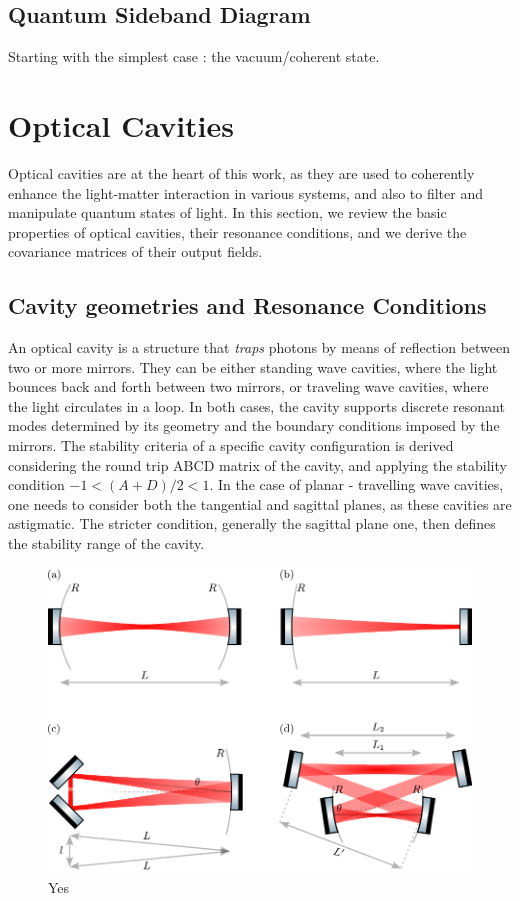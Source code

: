 \subsection{Quantum Sideband Diagram }

Starting with the simplest case : the vacuum/coherent state. 
\section{Optical Cavities}
Optical cavities are at the heart of this work, as they are used to coherently enhance the light-matter interaction in various systems, and also to filter and manipulate quantum states of light. In this section, we review the basic properties of optical cavities, their resonance conditions, and we derive the covariance matrices of their output fields. 

\subsection{Cavity geometries and Resonance Conditions}
An optical cavity is a structure that \textit{traps} photons by means of reflection between two or more mirrors. They can be either standing wave cavities, where the light bounces back and forth between two mirrors, or traveling wave cavities, where the light circulates in a loop. In both cases, the cavity supports discrete resonant modes determined by its geometry and the boundary conditions imposed by the mirrors. The stability criteria of a specific cavity configuration is derived considering the round trip ABCD matrix of the cavity, and applying the stability condition $-1 < (A+D)/2 < 1$. In the case of planar - travelling wave cavities, one needs to consider both the tangential and sagittal planes, as these cavities are astigmatic. The stricter condition, generally the sagittal plane one, then defines the stability range of the cavity.\\

\begin{figure}
\centering
\includegraphics[width=\textwidth]{./chap2/fig/cavity_types.pdf}
\caption{Yes} 
\label{fig:cavity_types}
\end{figure}



